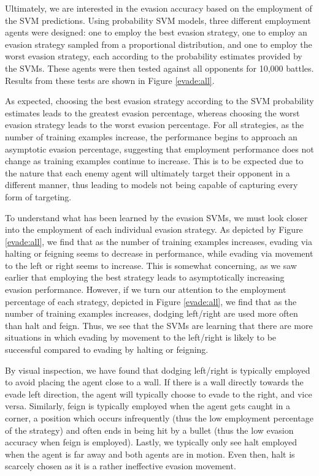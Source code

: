 \documentclass{article}
\theoremstyle{plain}
\theoremstyle{definition}
\theoremstyle{remark}
\begin{document}
Ultimately, we are interested in the evasion accuracy based on the employment of the SVM predictions. Using probability SVM models, three different employment agents were designed: one to employ the best evasion strategy, one to employ an evasion strategy sampled from a proportional distribution, and one to employ the worst evasion strategy, each according to the probability estimates provided by the SVMs. These agents were then tested against all opponents for 10,000 battles. Results from these tests are shown in Figure \ref{evade:all}. 

As expected, choosing the best evasion strategy according to the SVM probability estimates leads to the greatest evasion percentage, whereas choosing the worst evasion strategy leads to the worst evasion percentage. For all strategies, as the number of training examples increase, the performance begins to approach an asymptotic evasion percentage, suggesting that employment performance does not change as training examples continue to increase. This is to be expected due to the nature that each enemy agent will ultimately target their opponent in a different manner, thus leading to models not being capable of capturing every form of targeting.

To understand what has been learned by the evasion SVMs, we must look closer into the employment of each individual evasion strategy. As depicted by Figure \ref{evade:all}, we find that as the number of training examples increases, evading via halting or feigning seems to decrease in performance, while evading via movement to the left or right seems to increase. This is somewhat concerning, as we saw earlier that employing the best strategy leads to asymptotically increasing evasion performance. However, if we turn our attention to the employment percentage of each strategy, depicted in Figure \ref{evade:all}, we find that as the number of training examples increases, dodging left/right are used more often than halt and feign. Thus, we see that the SVMs are learning that there are more situations in which evading by movement to the left/right is likely to be successful compared to evading by halting or feigning.

By visual inspection, we have found that dodging left/right is typically employed to avoid placing the agent close to a wall. If there is a wall directly towards the evade left direction, the agent will typically choose to evade to the right, and vice versa. Similarly, feign is typically employed when the agent gets caught in a corner, a position which occurs infrequently (thus the low employment percentage of the strategy) and often ends in being hit by a bullet (thus the low evasion accuracy when feign is employed). Lastly, we typically only see halt employed when the agent is far away and both agents are in motion. Even then, halt is scarcely chosen as it is a rather ineffective evasion movement.
\end{document}
